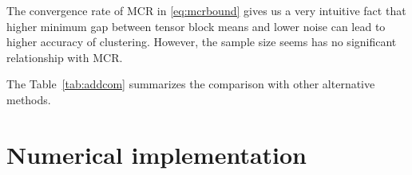 \documentclass{article}
\newtheorem{theorem}{Theorem}
\begin{document}
The convergence rate of MCR in \eqref{eq:mcrbound} gives us a very intuitive fact that higher minimum gap between tensor block means and lower noise can lead to higher accuracy of clustering.  However, the sample size seems has no significant relationship with MCR.

The Table~\ref{tab:addcom} summarizes the comparison with other alternative methods. 
\vspace{-.1cm}
\begin{table}[h!]
	\centering
	\caption{Summary of the comparison among different tensor clustering methods.}
	\label{tab:addcom}
\end{table}
\vspace{-.3cm}







\vspace{-.1cm}
\section{Numerical implementation}
\end{document}
